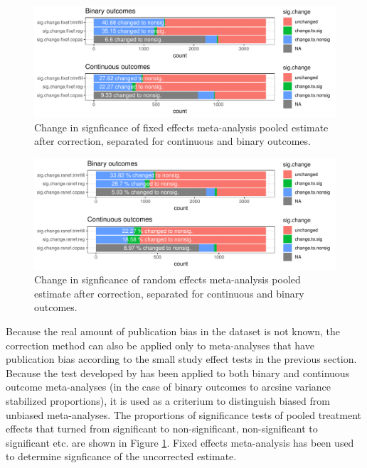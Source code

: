 \documentclass[11pt,a4paper,twoside]{book}\usepackage[]{graphicx}\usepackage[]{color}
\newenvironment{knitrout}{}{} %
\begin{document}
\begin{figure}
\begin{knitrout}
\color{fgcolor}

{\centering \includegraphics[width=\textwidth-3cm]{figure/ch02_figunnamed-chunk-29-1} 

}



\end{knitrout}
\caption{Change in signficance of fixed effects meta-analysis pooled estimate after correction, separated for continuous and binary outcomes.}
\label{significance.change.fixed.sep}
\end{figure}

\begin{figure}
\begin{knitrout}
\color{fgcolor}

{\centering \includegraphics[width=\textwidth-3cm]{figure/ch02_figunnamed-chunk-30-1} 

}



\end{knitrout}
\caption{Change in signficance of random effects meta-analysis pooled estimate after correction, separated for continuous and binary outcomes.}
\label{significance.change.random}
\end{figure}

Because the real amount of publication bias in the dataset is not known, the correction method can also be applied only to meta-analyses that have publication bias according to the small study effect tests in the previous section. Because the test developed by \citet{thomson.sharp} has been applied to both binary and continuous outcome meta-analyses (in the case of binary outcomes to arcsine variance stabilized proportions), it is used as a criterium to distinguish biased from unbiased meta-analyses. The proportions of significance tests of pooled treatment effects that turned from significant to non-significant, non-significant to significant etc. are shown in Figure \ref{significance.change.fixed.sep}. Fixed effects meta-analysis has been used to determine signficance of the uncorrected estimate.
\end{document}
